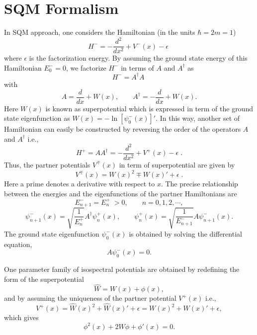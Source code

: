 \documentclass[11pt]{article}
\begin{document}




\section{SQM Formalism}
In SQM approach, one considers the Hamiltonian (in the units $\hbar=2m=1$)
\begin{equation}
H^-= -\frac{d^2}{dx^2}+V^-(x)-\epsilon\; \label{H-}
\end{equation}
where $\epsilon$ is the factorization energy. By assuming the ground state 
energy of this Hamiltonian $E^-_0=0$, we factorize $H^-$ in terms of  $ A$ and 
$A^{\dagger}$ as 
\begin{equation}
H^-= A^{\dagger}A\;
\end{equation}
with
\begin{equation}
A=\frac{d}{dx}+W(x),\qquad A^{\dagger}=-\frac{d}{dx}+W(x). \label{A-form}
\end{equation} 
Here $W(x)$ is known as superpotential which is expressed in term of the ground
state eigenfunction  as $W(x)=-\ln[\psi^-_0(x)]'$. In this way, another set of 
Hamiltonian can easily be constructed by reversing the order of the operators 
$A$ and $A^\dagger$ i.e., 
\begin{equation}
H^+=AA^{\dagger}=- \frac{d^2}{dx^2}+V^+(x)-\epsilon\;. \label{H+}
\end{equation}
Thus, the partner potentials \( V^{\mp}(x) \) in term of superpotential are given by 
\begin{equation}
V^{\mp}(x)=W(x)^2\mp W(x)'+\epsilon  \;. \label{V-form}
\end{equation}
Here a prime denotes a derivative with respect to \( x \).
The precise relationship between the energies and the eigenfunctions of the 
partner Hamiltonians are 
\begin{equation}
E^-_{n+1}=E^+_n\;> 0,\qquad n=0,1,2,\cdots,
\end{equation}
\begin{equation}
\psi^-_{n+1}(x)= \sqrt{\frac{1}{E^+_n}} A^{\dagger} \psi^+_n(x),\qquad\label{es}
\psi^+_n(x)= \sqrt{\frac{1}{E^-_{n+1}}} A \psi^-_{n+1}(x).
\end{equation}
The ground state eigenfunction \( \psi^-_0(x) \) is obtained by solving the differential equation,
\begin{equation}
A \psi^-_{0}(x)=0.
\end{equation}

One parameter family of isospectral potentials are obtained by redefining the 
form of the superpotential 
\begin{equation}
\hat{W}=W(x)+\phi(x),
\end{equation}
and by assuming the uniqueness of the partner potential $V^+(x)$ i.e.,
\begin{equation*}
V^+(x)=\hat{W}(x)^2+\hat{W}(x)' +\epsilon=W(x)^2+W(x)'+\epsilon,
\end{equation*}
which gives 
\begin{equation*}
\phi^2(x)+2W\phi+\phi'(x)=0.
\end{equation*}
\end{document}
